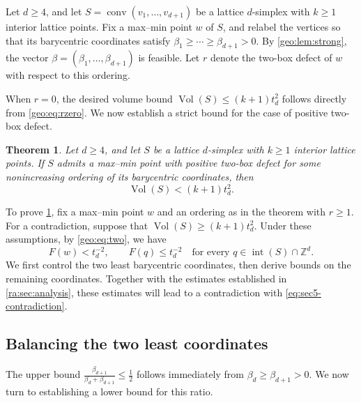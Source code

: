 \documentclass[reqno, 11pt]{article}
\numberwithin{equation}{section}
\newtheorem{theorem}{Theorem}[section]
\theoremstyle{definition}
\begin{document}
Let $d\ge4$, and let $S=\operatorname{conv}(v_1,\ldots,v_{d+1})$ be a lattice $d$-simplex with $k\ge1$ interior lattice points. Fix a max--min point $w$ of $S$, and relabel the vertices so that its barycentric coordinates satisfy $\beta_1\ge\cdots\ge\beta_{d+1}>0$.
By \cref{geo:lem:strong}, the vector $\beta=(\beta_1,\ldots,\beta_{d+1})$ is feasible. Let $r$ denote the two-box defect of $w$ with respect to this ordering.

When $r=0$, the desired volume bound $\operatorname{Vol}(S)\le(k+1)t_d^2$ follows directly from \eqref{geo:eq:rzero}. We now establish a strict bound for the case of positive two-box defect.

\begin{theorem}\label{main:strict}
Let $d\ge4$, and let $S$ be a lattice $d$-simplex with $k\ge1$ interior lattice points. If $S$ admits a max--min point with positive two-box defect for some nonincreasing ordering of its barycentric coordinates, then
\[
\operatorname{Vol}(S)<(k+1)t_d^2.
\]
\end{theorem}

To prove \cref{main:strict}, fix a max--min point $w$ and an ordering as in the theorem  with $r\ge1$. For a contradiction, suppose that $\operatorname{Vol}(S)\ge(k+1)t_d^2$.
Under these assumptions, by \eqref{geo:eq:two}, we have 
\begin{equation}\label{eq:sec5-contradiction}
F(w)<t_d^{-2},\qquad
F(q)\le t_d^{-2}
\quad\text{for every }
q\in\operatorname{int}(S)\cap\mathbb Z^d.
\end{equation}
We first control the two least barycentric coordinates,
then derive bounds on the remaining coordinates.
Together with the estimates established in \cref{ra:sec:analysis}, these estimates will lead to a contradiction with \eqref{eq:sec5-contradiction}.



\subsection{Balancing the two least coordinates}\label{sec:balance}
The upper bound $\frac{\beta_{d+1}}{\beta_d+\beta_{d+1}}\leq\frac12$ follows immediately from $\beta_{d}\ge\beta_{d+1}>0$. We now turn to establishing a lower bound for this ratio.
\end{document}
